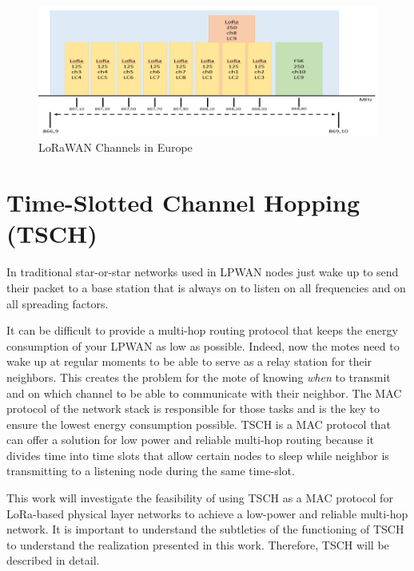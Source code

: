 \begin{figure}[H]
  \centering
  \includegraphics[width=\textwidth]{thesis.tex/chapters/context/fig/channels.png}
  \caption{LoRaWAN Channels in Europe\cite{Polonelli_2019}\label{fig:channels}}
\end{figure}


\section{Time-Slotted Channel Hopping (TSCH)}

In traditional star-or-star networks used in LPWAN nodes just wake up
to send their packet to a base station that is always on to listen on all
frequencies and on all spreading factors.

It can be difficult to provide a multi-hop routing protocol that keeps the energy
consumption of your LPWAN as low as possible.
Indeed, now the motes need to wake up at regular moments to be able to serve
as a relay station for their neighbors.
This creates the problem for the mote of knowing \emph{when} to transmit
and on which channel to be able to communicate with their neighbor.
The MAC protocol of the network stack is responsible for those tasks and
is the key to ensure the lowest energy consumption possible.
TSCH is a MAC protocol that can offer a solution for low power and reliable multi-hop routing
because it divides time into time slots that allow certain nodes to sleep while
neighbor is transmitting to a listening node during the same time-slot.

This work will investigate the feasibility of using TSCH as a MAC protocol for
LoRa-based physical layer networks to achieve a low-power and reliable
multi-hop network.
It is important to understand the subtleties of the functioning of TSCH to
understand the realization presented in this work.
Therefore, TSCH will be described in detail.

